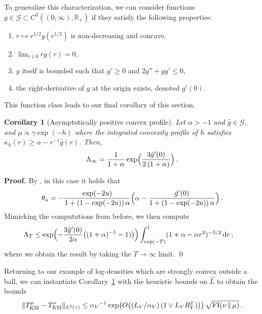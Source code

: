 \documentclass[12pt]{article}
\newcommand{\cG}{\mathcal{G}}
\newcommand{\RR}{\mathbb{R}}
\newcommand{\R}{\RR}
\newcommand{\1}{\mathds{1}}
\newcommand*{\rd}{\mathrm{d}}
\newcommand*{\dd}{\, \rd}
\newcommand{\mmid}{\,\Vert\,}
\renewenvironment{proof}{\noindent\textbf{Proof.}\hspace*{.3em}}{\qed \vspace{.1in}}
\theoremstyle{plain}
\newtheorem{corollary}[theorem]{Corollary}
\theoremstyle{definition}
\theoremstyle{remark}
\begin{document}
To generalize this characterization, we can consider functions $g \in \cG \subset C^2((0,\infty),\R_+)$ if they satisfy the following properties:
\begin{enumerate}
    \item $r\mapsto r^{1/2}g(r^{1/2})$ is non-decreasing and concave,
    \item $\lim_{r\downarrow 0} rg(r) = 0$,
    \item $g$ itself is bounded such that $g' \geq 0$ and $2 g'' + g g' \leq 0$,
    \item the right-derivative of ${g}$ at the origin exists, denoted ${g'(0)}$.
\end{enumerate}
This function class leads to our final corollary {of this section}.

\begin{corollary}[Asymptotically positive convex profile]\label{cor:asymp_conv} 
Let ${\alpha} > -1$ and $\hat{g} \in \cG$, and $\mu \propto \gamma \exp(-h)$ where the integrated convexity profile of $h$ satisfies $\kappa_h(r) \geq \alpha - r^{-1}\hat{g}(r)$. Then,
{\begin{align*}
    \Lambda_\infty = \frac{1}{1+\alpha}\exp\Bigl(\frac{3\hat g'(0)}{2\,(1+\alpha)}\Bigr)\,.
\end{align*}}
\end{corollary}
\begin{proof}
By \cite[Lemma 5.9]{conforti2025projected}, in this case it holds that
\begin{align*}
    \theta_u = -\frac{\exp(-2u)}{1 + (1-\exp(-2u))\,\alpha}\Bigl(\alpha - \frac{\hat{g}'(0)}{1 + (1-\exp(-2u))\,\alpha}\Bigr)\,.
\end{align*}
Mimicking the computations from before, we then compute 
\begin{align*}
 {\Lambda_T} &\leq \exp\Bigl(-\frac{3\hat g'(0)}{2\alpha}\bigl((1+\alpha)^{-1} - 1)\bigr)\Bigr)\int_{\exp(-T)}^1 (1 + \alpha -\alpha r^{2})^{-3/2} \dd r\,,
\end{align*}
where we obtain the result by taking the $T\to\infty$ limit.
\end{proof}

Returning to our example of log-densities which are strongly convex outside a ball, we can instantiate Corollary~\ref{cor:asymp_conv} with the heuristic bounds on $\hat L$ to obtain the bounds
\begin{align*}
    \| T_{\rm{KM}}^\mu - T_{\rm{KM}}^\nu\|_{L^2(\gamma)} \leq 
    {\alpha_V}^{-1} \exp\bigl(O\bigl((L_V/{\alpha_V})\,(1 \vee L_V R_V^2)\bigr)\bigr)\,\sqrt{{\rm FI}(\nu \mmid \mu)}\,.
\end{align*}
\end{document}
